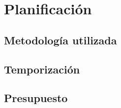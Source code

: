 \chapter{Planificación}

\section{Metodología utilizada}


\section{Temporización}

\section{Presupuesto}
